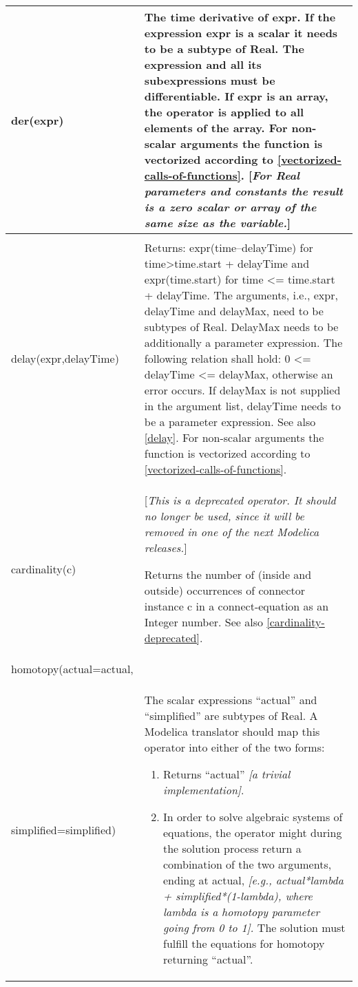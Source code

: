 \begin{longtable}{|p{5.1cm}|p{8cm}|} 
\hline \endhead
der(expr) & The time derivative of expr. If the expression expr is a
scalar it needs to be a subtype of Real. The expression and all its
subexpressions must be differentiable. If expr is an array, the operator
is applied to all elements of the array. For non-scalar arguments the
function is vectorized according to \autoref{vectorized-calls-of-functions}. {[}\emph{For Real
parameters and constants the result is a zero scalar or array of the
same size as the variable.}{]}\\ \hline
\begin{tabular}{@{}p{5.1cm}@{}}
delay(expr,delayTime,delayMax)\\
delay(expr,delayTime)
\end{tabular} & 
Returns: expr(time--delayTime) for~ time\textgreater{}time.start +
delayTime and expr(time.start) for time \textless{}= time.start +
delayTime. The arguments, i.e., expr, delayTime and delayMax, need to be
subtypes of Real. DelayMax needs to be additionally a parameter
expression. The following relation shall hold: 0 \textless{}= delayTime
\textless{}= delayMax, otherwise an error occurs. If delayMax is not
supplied in the argument list, delayTime needs to be a parameter
expression. See also \autoref{delay}. For non-scalar arguments the
function is vectorized according to \autoref{vectorized-calls-of-functions}.\\ \hline
cardinality(c) & {[}\emph{This is a deprecated operator. It should no longer be used,
since it will be removed in one of the next Modelica releases.}{]}

Returns the number of (inside and outside) occurrences of connector
instance c in a connect-equation as an Integer number. See also \autoref{cardinality-deprecated}.\\ \hline
homotopy(actual=actual,\\
simplified=simplified) & The scalar expressions ``actual'' and ``simplified'' are subtypes of
Real. A Modelica translator should map this operator into either of the
two forms:

\begin{enumerate}
\item
  Returns ``actual'' \emph{{[}a trivial implementation{]}}.
\item
  In order to solve algebraic systems of equations, the operator might
  during the solution process return a combination of the two arguments,
  ending at actual, \emph{{[}e.g.,
  actual*lambda + simplified*(1-lambda),
  where lambda is a homotopy parameter going from 0 to 1{]}.}
  The solution must fulfill the equations for homotopy returning
  ``actual''.
\end{enumerate}


\end{longtable}
